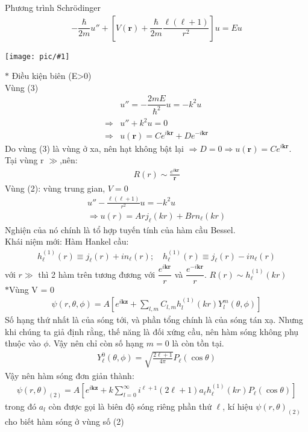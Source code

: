 \documentclass{report}
\newcommand{\image}[1]{
	\begin{center}
		\texttt{[image: pic/\#1]}
	\end{center}
}
\renewcommand{\l}{\ell}
\begin{document}
Phương trình Schr\"{o}dinger
\begin{align*}
	-\dfrac{\hbar}{2m}u'' + \left[V(\mathbf{r})+ \dfrac{\hbar}{2m}\dfrac{\l(\l+1)}{r^2}\right]u = Eu
\end{align*}
\image{zone.png}
$\ast$ Điều kiện biên (E>0)\\
Vùng (3)
\begin{align*}
	            & u'' = -\dfrac{2mE}{\hbar^2}u = -k^2u                \\
	\Rightarrow & u'' + k^2u =0                                       \\
	\Rightarrow & u(\mathbf{r})=Ce^{i\mathbf{kr}} +De^{-i\mathbf{kr}}
\end{align*}
Do vùng (3) là vùng ở xa, nên hạt không bật lại $\Rightarrow D = 0 $$\Rightarrow u(\mathbf{r})=Ce^{i\mathbf{kr}}$. \\
Tại vùng r $\gg$,nên:
	\begin{align*}
		R(r) \sim \frac{e^{i\mathbf{kr}}}{\mathbf{r}}
	\end{align*}
	Vùng (2): vùng trung gian, $V=0$
	\begin{align*}
		u'' - \frac{\l(\l+1)}{r^2}u = -k^2u \\
		\Rightarrow u(r) = Arj_{\l}(kr)+  Brn_{\l}(kr)
	\end{align*}
	Nghiện của nó chính là tổ hợp tuyến tính của hàm cầu Bessel.\\
	Khái niệm mới: Hàm Hankel cầu:
	\begin{align}
		h_{\l}^{(1)}(r) \equiv j_{\l}(r) + in_{\l}(r); \quad h_{\l}^{(1)}(r) \equiv j_{\l}(r) - in_{\l}(r)
	\end{align}\label{eq1.3}
	với $r \gg$ thì 2 hàm trên tương đương với $\dfrac{e^{i\mathbf{kr}}}{r}$ và $\dfrac{e^{-i\mathbf{kr}}}{r}$. $R(r)\sim h_{\l}^{(1)}(kr)$\\
$\ast$Vùng V = 0
	\begin{align*}
		\psi(r,\theta,\phi) = A \left[e^{i\mathbf{kz}} + \sum_{l,m}C_{l,m} h_l^{(1)}(kr) Y_l^m(\theta,\phi)  \right]
	\end{align*}
	Số hạng thứ nhất là của sóng tới, và phần tổng chính là của sóng tán xạ. Nhưng khi chúng ta giả định rằng, thế năng là đối xứng cầu, nên hàm sóng không phụ thuộc vào $\phi$. Vậy nên chỉ còn số hạng $m=0$ là còn tồn tại.
	\begin{align*}
		Y_{\l}^0 (\theta,\phi) = \sqrt{\frac{2\l+1}{4\pi}}P_{\l}(\cos\theta)
	\end{align*}
	Vậy nên hàm sóng đơn giản thành:
	\begin{align*}
		\psi(r,\theta)_{(2)} = A \left[e^{i\mathbf{kz}} + k\sum_{l=0}^{\infty}i^{\l+1}(2\l+1)a_{\l} h_{\l}^{(1)}(kr) P_{\l}(\cos\theta)\right]
	\end{align*}
	trong đó $a_l$ còn được gọi là biên độ sóng riêng phần thứ $\l$, kí hiệu $\psi(r,\theta)_{(2)}$ cho biết hàm sóng ở vùng số (2)
\end{document}
